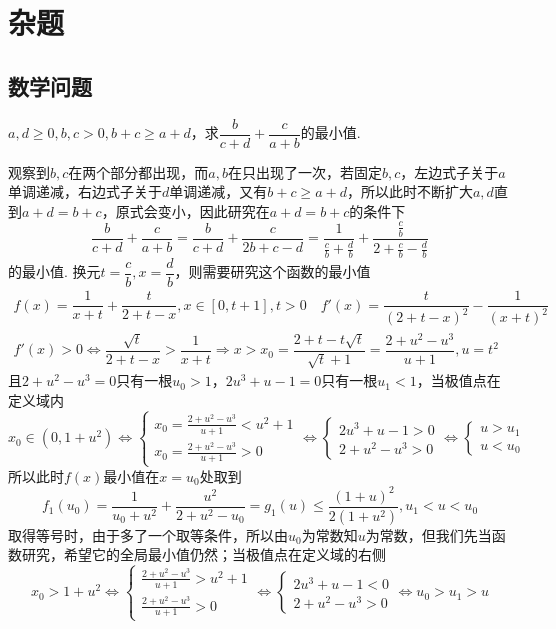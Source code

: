 \chapter{杂题}
\section{数学问题}
\newpage
\begin{example}{}{}
    $a,d\geq 0,b,c>0,b+c\geq a+d$，求$\dfrac{b}{c+d}+\dfrac{c}{a+b}$的最小值.
\end{example}
\begin{solution}
    观察到$b,c$在两个部分都出现，而$a,b$在只出现了一次，若固定$b,c$，左边式子关于$a$单调递减，右边式子关于$d$单调递减，又有$b+c\geq a+d$，所以此时不断扩大$a,d$直到$a+d=b+c$，原式会变小，因此研究在$a+d=b+c$的条件下
    \[\dfrac{b}{c+d}+\dfrac{c}{a+b}=\dfrac{b}{c+d}+\dfrac{c}{2b+c-d}=\dfrac{1}{\frac{c}{b}+\frac{d}{b}}+\dfrac{\frac{c}{b}}{2+\frac{c}{b}-\frac{d}{b}}\]的最小值.
    换元$t=\dfrac{c}{b},x=\dfrac{d}{b}$，则需要研究这个函数的最小值
    \begin{align*}f(x)=\dfrac{1}{x+t}+\dfrac{t}{2+t-x},x\in[0,t+1],t>0\quad
        f'(x)=\dfrac{t}{(2+t-x)^2}-\dfrac{1}{(x+t)^2}\\
        f'(x)>0\Leftrightarrow \dfrac{\sqrt{t}}{2+t-x}>\dfrac{1}{x+t}
        \Rightarrow x>x_0=\dfrac{2+t-t\sqrt{t}}{\sqrt{t}+1}=\dfrac{2+u^2-u^3}{u+1},u=t^2
    \end{align*}
    且$2+u^2-u^3=0$只有一根$u_0>1$，$ 2u^3+u-1=0$只有一根$u_1<1$，当极值点在定义域内
    \[x_0\in(0,1+u^2)\Leftrightarrow\begin{cases}x_0=\frac{2+u^2-u^3}{u+1}<u^2+1\\x_0=\frac{2+u^2-u^3}{u+1}>0\end{cases}\Leftrightarrow\begin{cases}2u^3+u-1>0\\2+u^2-u^3>0\end{cases}\Leftrightarrow \begin{cases}u>u_1\\u<u_0\end{cases}\]
    所以此时$f(x)$最小值在$x=u_0$处取到
    \[f_1(u_0)=\dfrac{1}{u_0+u^2}+\dfrac{u^2}{2+u^2-u_0}=g_1(u)\leq\dfrac{(1+u)^2}{2(1+u^2)},u_1<u<u_0\]
    取得等号时，由于多了一个取等条件，所以由$u_0$为常数知$u$为常数，但我们先当函数研究，希望它的全局最小值仍然；当极值点在定义域的右侧
    \[x_0>1+u^2\Leftrightarrow\begin{cases}\frac{2+u^2-u^3}{u+1}>u^2+1\\\frac{2+u^2-u^3}{u+1}>0\end{cases}\Leftrightarrow \begin{cases}2u^3+u-1<0\\2+u^2-u^3>0\end{cases}\Leftrightarrow u_0>u_1>u\]

\end{solution}
